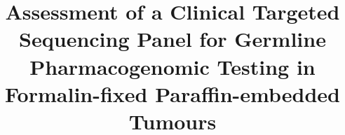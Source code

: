 \documentclass{bmcart}
\begin{document}
\begin{frontmatter}

\begin{fmbox}


\title{Assessment of a Clinical Targeted Sequencing Panel for Germline Pharmacogenomic Testing in Formalin-fixed Paraffin-embedded Tumours}


\author[
   addressref={aff1},                   %
   email={eyap@bcgsc.ca}   %
]{ }
\author[
   addressref={aff1,aff2},
	 corref={aff1},                       %
   email={akarsan@bcgsc.ca}
]{ }


\address[id=aff1]{%
  , %
  ,                     %
  ,                           %
}
\address[id=aff2]{%
  ,
  ,
  ,
}


\end{fmbox}
\end{frontmatter}
\end{document}
